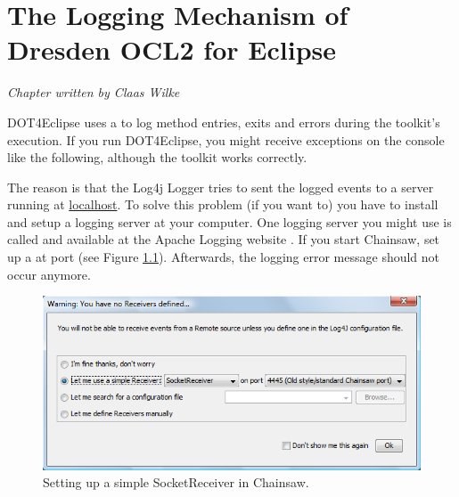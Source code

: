 \chapter{The Logging Mechanism of Dresden OCL2 for Eclipse}
\label{chapter:logging}

\begin{flushright}
\textit{Chapter written by Claas Wilke}
\end{flushright}

\acl{DOT4Eclipse} uses a  to log method entries, exits and errors during the toolkit's execution. If you run \acl{DOT4Eclipse}, you might receive exceptions on the console like the following, although the toolkit works correctly. 

\begin{center}
\end{center}

The reason is that the Log4j Logger tries to sent the logged events to a server running at \url{localhost}. To solve this problem (if you want to) you have to install and setup a logging server at your computer. One logging server you might use is called  and available at the Apache Logging website \cite{WWW:chainsaw}. If you start Chainsaw, set up a  at port  (see Figure \ref{pic:logging:chainsaw01}). Afterwards, the logging error message should not occur anymore. 

\begin{figure}[!htbp]
	\centering
	\includegraphics[width=0.8\linewidth]{figures/logging/chainsaw01}
	\caption{Setting up a simple SocketReceiver in Chainsaw.}
	\label{pic:logging:chainsaw01}
\end{figure}